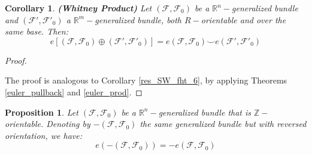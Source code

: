 \documentclass[12pt,oneside]{book}
\newtheorem{prop}   {Proposition}[chapter]
\newtheorem{cor}    {Corollary}[chapter]
\newcommand{\R}{\mathbb{R}}
\newcommand{\Z}{\mathbb{Z}}
\newcommand{\ccup}{\smile}
\begin{document}
    \begin{cor}{\bf (Whitney Product)}
    	Let $(\mathcal{F},\mathcal{F}_{0})$ be a $\R^{n}-$generalized bundle and 
        $(\mathcal{F'},\mathcal{F'}_{0})$ a $\R^{m}-$generalized bundle, both $R-$orientable and over the same base. Then:
    	$$ e[(\mathcal{F},\mathcal{F}_{0})\oplus (\mathcal{F'},\mathcal{F'}_{0})]=e(\mathcal{F},\mathcal{F}_{0})\ccup e(\mathcal{F'},\mathcal{F'}_{0}) $$
    \end{cor}

    \begin{proof}

        \

    	The proof is analogous to Corollary \ref{res_SW_fht_6}, by applying Theorems \ref{euler_pullback} and \ref{euler_prod}.

    \end{proof}

    \begin{prop}
	Let $(\mathcal{F},\mathcal{F}_{0})$ be a $\R^{n}-$generalized bundle that is $\Z-$orientable. 
    Denoting by $-(\mathcal{F},\mathcal{F}_{0})$ the same generalized bundle but with reversed orientation, we have:
	$$ e\left( -(\mathcal{F},\mathcal{F}_{0}) \right) = -e(\mathcal{F},\mathcal{F}_{0}) $$
    \end{prop}
\end{document}
